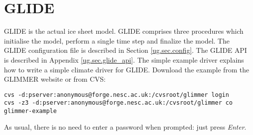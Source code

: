 \section{GLIDE}
GLIDE is the actual ice sheet model. GLIDE comprises three procedures
which initialise the model, perform a single time step and finalize
the model. The GLIDE configuration file is described in Section
\ref{ug.sec.config}. The GLIDE API is described in Appendix
\ref{ug.sec.glide_api}. The simple example driver explains how to
write a simple climate driver for GLIDE. Download the example from the
GLIMMER website or from CVS:
%
\begin{verbatim}
cvs -d:pserver:anonymous@forge.nesc.ac.uk:/cvsroot/glimmer login
cvs -z3 -d:pserver:anonymous@forge.nesc.ac.uk:/cvsroot/glimmer co glimmer-example
\end{verbatim}
%
As usual, there is no need to enter a password when prompted: just
press {\it Enter}.

